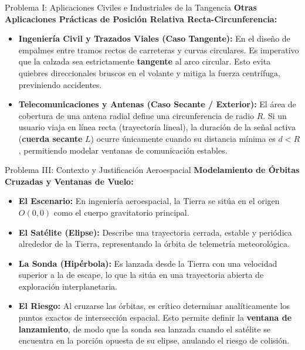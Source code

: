 \documentclass[aspectratio=169]{beamer}
\begin{document}
\begin{frame}{Problema I: Aplicaciones Civiles e Industriales de la Tangencia}
  \textbf{Otras Aplicaciones Prácticas de Posición Relativa Recta-Circunferencia:}
  \vspace{0.3cm}
  \begin{itemize}
    \item \textbf{Ingeniería Civil y Trazados Viales (Caso Tangente):}
      En el diseño de empalmes entre tramos rectos de carreteras y curvas circulares. Es imperativo que la calzada sea estrictamente \textbf{tangente} al arco circular. Esto evita quiebres direccionales bruscos en el volante y mitiga la fuerza centrífuga, previniendo accidentes.
    \vspace{0.2cm}
    \item \textbf{Telecomunicaciones y Antenas (Caso Secante / Exterior):}
      El área de cobertura de una antena radial define una circunferencia de radio $R$. Si un usuario viaja en línea recta (trayectoria lineal), la duración de la señal activa (\textbf{cuerda secante} $L$) ocurre únicamente cuando su distancia mínima es $d < R$, permitiendo modelar ventanas de comunicación estables.
  \end{itemize}
\end{frame}

\begin{frame}{Problema III: Contexto y Justificación Aeroespacial}
  \textbf{Modelamiento de Órbitas Cruzadas y Ventanas de Vuelo:}
  \vspace{0.3cm}
  \begin{itemize}
    \item \textbf{El Escenario:} En ingeniería aeroespacial, la Tierra se sitúa en el origen $O(0,0)$ como el cuerpo gravitatorio principal.
    \item \textbf{El Satélite (Elipse):} Describe una trayectoria cerrada, estable y periódica alrededor de la Tierra, representando la órbita de telemetría meteorológica.
    \item \textbf{La Sonda (Hipérbola):} Es lanzada desde la Tierra con una velocidad superior a la de escape, lo que la sitúa en una trayectoria abierta de exploración interplanetaria.
    \item \textbf{El Riesgo:} Al cruzarse las órbitas, es crítico determinar analíticamente los puntos exactos de intersección espacial. Esto permite definir la \textbf{ventana de lanzamiento}, de modo que la sonda sea lanzada cuando el satélite se encuentra en la porción opuesta de su elipse, anulando el riesgo de colisión.
  \end{itemize}
\end{frame}
\end{document}
